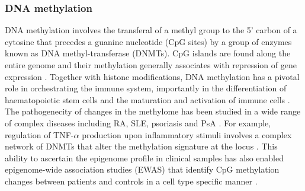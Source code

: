 \subsubsection{DNA methylation}
DNA methylation involves the transferal of a methyl group to the 5' carbon of a cytosine that precedes a guanine nucleotide (CpG sites) by a group of enzymes known as DNA methyl-transferase (DNMTs). CpG islands are found along the entire genome and their methylation generally associates with repression of gene expression \parencite{Herman2003}. Together with histone modifications, DNA methylation has a pivotal role in orchestrating the immune system, importantly in the differentiation of haematopoietic stem cells and the maturation and activation of immune cells \parencite{Sellars2015,Lai2013}. 
The pathogenecity of changes in the methylome has been studied in a wide range of complex diseases including RA, SLE, psoriasis and PsA \parencite{Lei2009,Liu2013,Zhang2010}. For example, regulation of TNF-$\alpha$ production upon inflammatory stimuli involves a complex network of DNMTs that alter the methylation signature at the locus \parencite{Sullivan2007}. %
This ability to ascertain the epigenome profile in clinical samples has also enabled epigenome-wide association studies (EWAS) that identify CpG methylation changes between patients and controls in a cell type specific manner \parencite{Zhou2016}.


